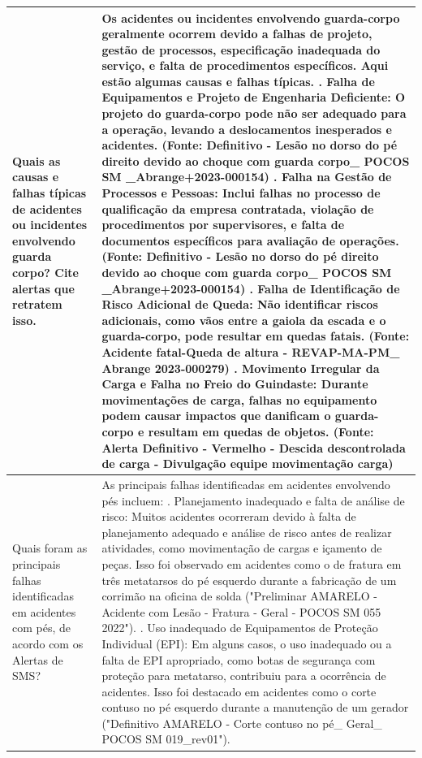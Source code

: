 \begin{landscape}
\begin{longtable}{|p{3cm}|p{22cm}|}
        Quais as causas e falhas típicas de acidentes ou incidentes envolvendo guarda corpo?  Cite alertas que retratem isso. & 
        Os acidentes ou incidentes envolvendo guarda-corpo geralmente ocorrem devido a falhas de projeto, gestão de processos, especificação inadequada do serviço, e falta de procedimentos específicos. Aqui estão algumas causas e falhas típicas.
        \newline 1. Falha de Equipamentos e Projeto de Engenharia Deficiente: O projeto do guarda-corpo pode não ser adequado para a operação, levando a deslocamentos inesperados e acidentes. (Fonte: Definitivo - Lesão no dorso do pé direito devido ao choque com guarda corpo\_ POCOS SM \_Abrange+2023-000154)         
        \newline 2. Falha na Gestão de Processos e Pessoas: Inclui falhas no processo de qualificação da empresa contratada, violação de procedimentos por supervisores, e falta de documentos específicos para avaliação de operações. (Fonte: Definitivo - Lesão no dorso do pé direito devido ao choque com guarda corpo\_ POCOS SM \_Abrange+2023-000154)         
        \newline 3. Falha de Identificação de Risco Adicional de Queda: Não identificar riscos adicionais, como vãos entre a gaiola da escada e o guarda-corpo, pode resultar em quedas fatais. (Fonte: Acidente fatal-Queda de altura - REVAP-MA-PM\_ Abrange 2023-000279)         
        \newline 4. Movimento Irregular da Carga e Falha no Freio do Guindaste: Durante movimentações de carga, falhas no equipamento podem causar impactos que danificam o guarda-corpo e resultam em quedas de objetos. (Fonte: Alerta Definitivo - Vermelho - Descida descontrolada de carga - Divulgação equipe movimentação carga) \\ \hline
Quais foram as principais falhas identificadas em acidentes com pés, de acordo com os Alertas de SMS? & As principais falhas identificadas em acidentes envolvendo pés incluem:        
        \newline 1. Planejamento inadequado e falta de análise de risco: Muitos acidentes ocorreram devido à falta de planejamento adequado e análise de risco antes de realizar atividades, como movimentação de cargas e içamento de peças. Isso foi observado em acidentes como o de fratura em três metatarsos do pé esquerdo durante a fabricação de um corrimão na oficina de solda ("Preliminar AMARELO - Acidente com Lesão - Fratura - Geral - POCOS SM 055 2022").        
        \newline 2. Uso inadequado de Equipamentos de Proteção Individual (EPI): Em alguns casos, o uso inadequado ou a falta de EPI apropriado, como botas de segurança com proteção para metatarso, contribuiu para a ocorrência de acidentes. Isso foi destacado em acidentes como o corte contuso no pé esquerdo durante a manutenção de um gerador ("Definitivo AMARELO - Corte contuso no pé\_ Geral\_ POCOS SM 019\_rev01").        

\end{longtable}
\end{landscape}
